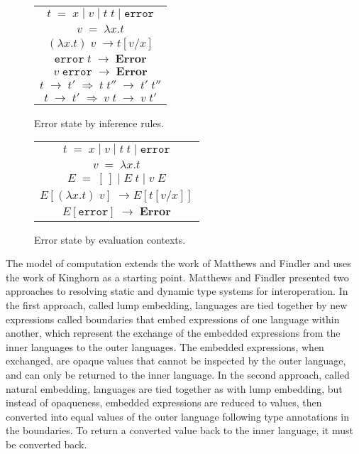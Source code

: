 \begin{figure}[htb]
\onehalfspacing
\centering
\begin{tabular}{c}
$t \; = \; x \; | \; v \; | \; t \; t \; | \; \mathtt{error}$ \\
$v \; = \; \lambda x.t$ \\
$(\lambda x.t) \; v \; \rightarrow t[v/x]$ \\
$\mathtt{error} \; t \; \rightarrow \; \textbf{Error}$ \\
$v \; \mathtt{error} \; \rightarrow \; \textbf{Error}$ \\
$t \; \rightarrow \; t' \; \Rightarrow \; t \; t'' \; \rightarrow \; t' \; t''$ \\
$t \; \rightarrow \; t' \; \Rightarrow \; v \; t \; \rightarrow \; v \; t'$ \\
\end{tabular}
\caption{Error state by inference rules.}
\label{figinf}
\end{figure}

\begin{figure}[htb]
\onehalfspacing
\centering
\begin{tabular}{c}
$t \; = \; x \; | \; v \; | \; t \; t \; | \; \mathtt{error}$ \\
$v \; = \; \lambda x.t$ \\
$E \; = \; [\,] \; | \; E \; t \; | \; v \; E$ \\
$E[(\lambda x.t) \; v] \; \rightarrow E[t[v/x]]$ \\
$E[\mathtt{error}] \; \rightarrow \; \textbf{Error}$ \\
\end{tabular}
\caption{Error state by evaluation contexts.}
\label{figcon}
\end{figure}



The model of computation extends the work of Matthews and Findler \cite{matthews07} and uses the work of Kinghorn \cite{kinghorn07} as a starting point. Matthews and Findler presented \cite{matthews07} two approaches to resolving static and dynamic type systems for interoperation. In the first approach, called lump embedding, languages are tied together by new expressions called boundaries that embed expressions of one language within another, which represent the exchange of the embedded expressions from the inner languages to the outer languages. The embedded expressions, when exchanged, are opaque values that cannot be inspected by the outer language, and can only be returned to the inner language. In the second approach, called natural embedding, languages are tied together as with lump embedding, but instead of opaqueness, embedded expressions are reduced to values, then converted into equal values of the outer language following type annotations in the boundaries. To return a converted value back to the inner language, it must be converted back.

